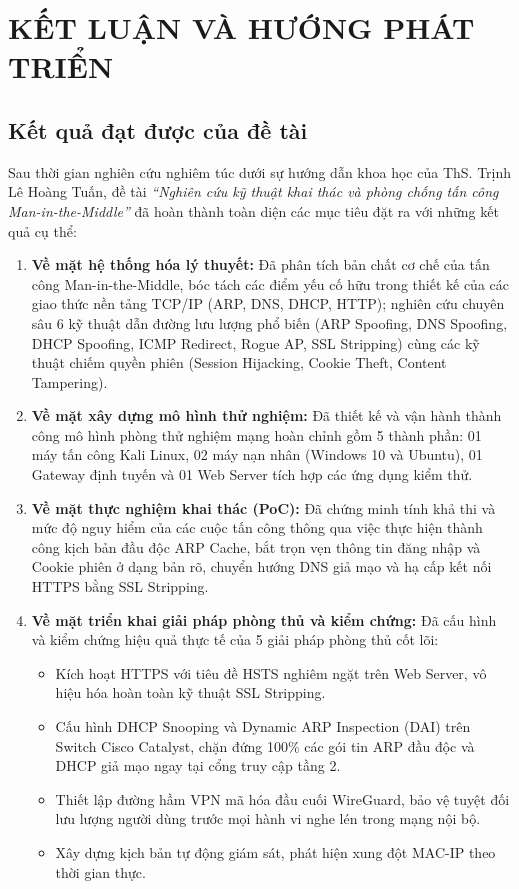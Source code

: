 \chapter{KẾT LUẬN VÀ HƯỚNG PHÁT TRIỂN}

\section{Kết quả đạt được của đề tài}

Sau thời gian nghiên cứu nghiêm túc dưới sự hướng dẫn khoa học của ThS. Trịnh Lê Hoàng Tuấn, đề tài \textit{``Nghiên cứu kỹ thuật khai thác và phòng chống tấn công Man-in-the-Middle''} đã hoàn thành toàn diện các mục tiêu đặt ra với những kết quả cụ thể:

\begin{enumerate}
  \item \textbf{Về mặt hệ thống hóa lý thuyết:} Đã phân tích bản chất cơ chế của tấn công Man-in-the-Middle, bóc tách các điểm yếu cố hữu trong thiết kế của các giao thức nền tảng TCP/IP (ARP, DNS, DHCP, HTTP); nghiên cứu chuyên sâu 6 kỹ thuật dẫn đường lưu lượng phổ biến (ARP Spoofing, DNS Spoofing, DHCP Spoofing, ICMP Redirect, Rogue AP, SSL Stripping) cùng các kỹ thuật chiếm quyền phiên (Session Hijacking, Cookie Theft, Content Tampering).
  \item \textbf{Về mặt xây dựng mô hình thử nghiệm:} Đã thiết kế và vận hành thành công mô hình phòng thử nghiệm mạng hoàn chỉnh gồm 5 thành phần: 01 máy tấn công Kali Linux, 02 máy nạn nhân (Windows 10 và Ubuntu), 01 Gateway định tuyến và 01 Web Server tích hợp các ứng dụng kiểm thử.
  \item \textbf{Về mặt thực nghiệm khai thác (PoC):} Đã chứng minh tính khả thi và mức độ nguy hiểm của các cuộc tấn công thông qua việc thực hiện thành công kịch bản đầu độc ARP Cache, bắt trọn vẹn thông tin đăng nhập và Cookie phiên ở dạng bản rõ, chuyển hướng DNS giả mạo và hạ cấp kết nối HTTPS bằng SSL Stripping.
  \item \textbf{Về mặt triển khai giải pháp phòng thủ và kiểm chứng:} Đã cấu hình và kiểm chứng hiệu quả thực tế của 5 giải pháp phòng thủ cốt lõi:
    \begin{itemize}
      \item Kích hoạt HTTPS với tiêu đề HSTS nghiêm ngặt trên Web Server, vô hiệu hóa hoàn toàn kỹ thuật SSL Stripping.
      \item Cấu hình DHCP Snooping và Dynamic ARP Inspection (DAI) trên Switch Cisco Catalyst, chặn đứng 100\% các gói tin ARP đầu độc và DHCP giả mạo ngay tại cổng truy cập tầng 2.
      \item Thiết lập đường hầm VPN mã hóa đầu cuối WireGuard, bảo vệ tuyệt đối lưu lượng người dùng trước mọi hành vi nghe lén trong mạng nội bộ.
      \item Xây dựng kịch bản tự động giám sát, phát hiện xung đột MAC-IP theo thời gian thực.
    \end{itemize}
\end{enumerate}

